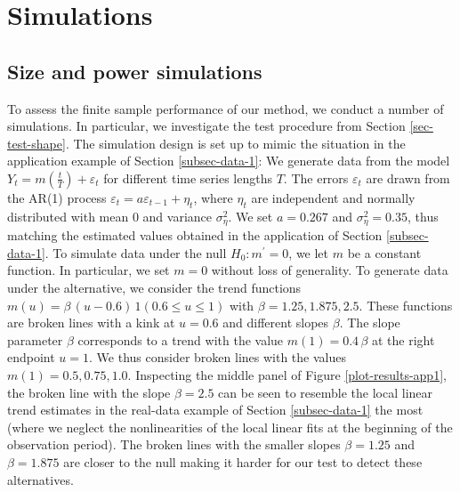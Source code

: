 \documentclass[a4paper,12pt]{article}
\begin{document}
\section{Simulations}\label{sec-sim}

\subsection{Size and power simulations}\label{subsec-sim-1}

To assess the finite sample performance of our method, we conduct a number of simulations. In particular, we investigate the test procedure from Section \ref{sec-test-shape}. The simulation design is set up to mimic the situation in the application example of Section \ref{subsec-data-1}: We generate data from the model $Y_t = m(\frac{t}{T}) + \varepsilon_t$ for different time series lengths $T$. The errors $\varepsilon_t$ are drawn from the AR(1) process $\varepsilon_t = a \varepsilon_{t-1} + \eta_t$, where $\eta_t$ are independent and normally distributed with mean $0$ and variance $\sigma_\eta^2$. We set $a = 0.267$ and $\sigma_\eta^2 = 0.35$, thus matching the estimated values obtained in the application of Section \ref{subsec-data-1}. To simulate data under the null $H_0: m^\prime = 0$, we let $m$ be a constant function. In particular, we set $m = 0$ without loss of generality. To generate data under the alternative, we consider the trend functions $m(u) = \beta \, (u - 0.6) \, 1(0.6 \le u \le 1)$ with $\beta = 1.25, 1.875, 2.5$. These functions are broken lines with a kink at $u = 0.6$ and different slopes $\beta$. The slope parameter $\beta$ corresponds to a trend with the value $m(1) = 0.4 \, \beta$ at the right endpoint $u = 1$. We thus consider broken lines with the values $m(1) = 0.5, 0.75, 1.0$. Inspecting the middle panel of Figure \ref{plot-results-app1}, the broken line with the slope $\beta = 2.5$ can be seen to resemble the local linear trend estimates in the real-data example of Section \ref{subsec-data-1} the most (where we neglect the nonlinearities of the local linear fits at the beginning of the observation period). The broken lines with the smaller slopes $\beta = 1.25$ and $\beta = 1.875$ are closer to the null making it harder for our test to detect these alternatives.
\end{document}
